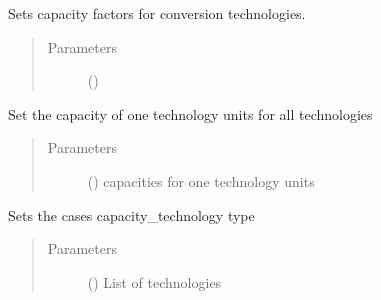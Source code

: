 \documentclass[a4paper,12pt,english]{article}
\begin{document}
\begin{fulllineitems}
\begin{fulllineitems}
\label{\detokenize{GOCPI:GOCPI.CreateCases.CreateCases.set_capacity_factor}}
Sets capacity factors for conversion technologies.
\begin{quote}\begin{description}
\item[{Parameters}] \leavevmode
{} (\sphinxstyleliteralemphasis{\sphinxupquote{, }}) \textendash{} 

\end{description}\end{quote}

\end{fulllineitems}


\begin{fulllineitems}
\label{\detokenize{GOCPI:GOCPI.CreateCases.CreateCases.set_capacity_of_one_technology_unit}}
Set the capacity of one technology units for all technologies
\begin{quote}\begin{description}
\item[{Parameters}] \leavevmode
{} (\sphinxstyleliteralemphasis{\sphinxupquote{, }}) \textendash{} capacities for one technology units

\end{description}\end{quote}

\end{fulllineitems}


\begin{fulllineitems}
\label{\detokenize{GOCPI:GOCPI.CreateCases.CreateCases.set_capacity_technology}}
Sets the cases capacity\_technology type
\begin{quote}\begin{description}
\item[{Parameters}] \leavevmode
{} () \textendash{} List of technologies


\end{description}
\end{quote}
\end{fulllineitems}
\end{fulllineitems}
\end{document}

